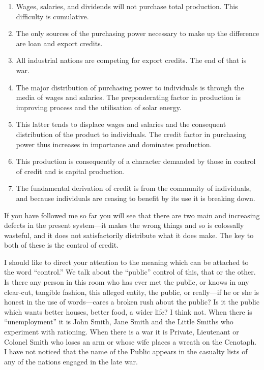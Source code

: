 \documentclass{book}
\begin{document}
\begin{enumerate}
	\item Wages, salaries, and dividends will not purchase total production. This difficulty is cumulative.


	\item The only sources of the purchasing power necessary to make up the difference are loan and export credits.


	\item All industrial nations are competing for export credits. The end of that is war.


	\item The major distribution of purchasing power to individuals is through the media of wages and salaries. The preponderating factor in production is improving process and the utilisation of solar energy.


	\item This latter tends to displace wages and salaries and the consequent distribution of the product to individuals. The credit factor in purchasing power thus increases in importance and dominates production.


	\item This production is consequently of a character demanded by those in control of credit and is capital production.


	\item The fundamental derivation of credit is from the community of individuals, and because individuals are ceasing to benefit by its use it is breaking down.



\end{enumerate}
If you have followed me so far you will see that there are two main and increasing defects in the present system—it makes the wrong things and so is colossally wasteful, and it does not satisfactorily distribute what it does make. The key to both of these is the control of credit.

I should like to direct your attention to the meaning which can be attached to the word “control.” We talk about the “public” control of this, that or the other. Is there any person in this room who has ever met the public, or knows in any clear-cut, tangible fashion, this alleged entity, the public, or really—if he or she is honest in the use of words—cares a broken rush about the public? Is it the public which wants better houses, better food, a wider life? I think not. When there is “unemployment” it is John Smith, Jane Smith and the Little Smiths who experiment with rationing. When there is a war it is Private, Lieutenant or Colonel Smith who loses an arm or whose wife places a wreath on the Cenotaph. I have not noticed that the name of the Public appears in the casualty lists of any of the nations engaged in the late war.
\end{document}
